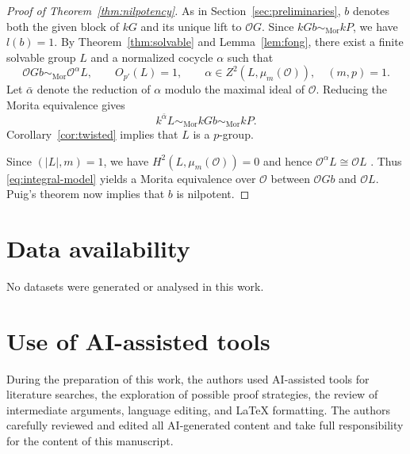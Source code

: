 \documentclass[11pt,a4paper]{article}
\theoremstyle{definition}
\theoremstyle{remark}
\numberwithin{equation}{section}
\newcommand{\cO}{\mathcal{O}}
\newcommand{\Mor}{\mathrm{Mor}}
\begin{document}
	\begin{proof}[Proof of Theorem~\ref{thm:nilpotency}]
		As in Section~\ref{sec:preliminaries}, $b$ denotes both the given block of $kG$ and its unique lift to $\cO G$.
		Since $kGb\sim_{\Mor}kP$, we have $l(b)=1$.
		By Theorem~\ref{thm:solvable} and Lemma~\ref{lem:fong}, there exist
		a finite solvable group $L$ and a normalized cocycle $\alpha$ such that
		\begin{equation}\label{eq:integral-model}
			\cO Gb\sim_{\Mor}\cO^\alpha L,
			\qquad O_{p'}(L)=1,
			\qquad \alpha\in Z^2(L,\mu_m(\cO)),\quad (m,p)=1.
		\end{equation}
		Let $\bar\alpha$ denote the reduction of $\alpha$ modulo the maximal ideal of $\cO$. Reducing the Morita equivalence gives
		\[
		k^{\bar\alpha}L\sim_{\Mor}kGb\sim_{\Mor}kP.
		\]
		Corollary~\ref{cor:twisted} implies that $L$ is a $p$-group.
		
		Since $(|L|,m)=1$, we have $H^2(L,\mu_m(\cO))=0$ and hence
		$\cO^\alpha L\cong\cO L$ \cite[Propositions~1.2.9(i) and~1.2.6]{Linckelmann2018a}.
		Thus \eqref{eq:integral-model} yields a Morita equivalence over $\cO$ between $\cO Gb$ and $\cO L$.
		Puig's theorem \cite[Theorem~8.2]{Puig1999} now implies that $b$ is nilpotent.
	\end{proof}
	
	\section*{Data availability}
	No datasets were generated or analysed in this work.
	
	\section*{Use of AI-assisted tools}
	During the preparation of this work, the authors used AI-assisted tools for literature searches, the exploration of possible proof strategies, the review of intermediate arguments, language editing, and LaTeX formatting. The authors carefully reviewed and edited all AI-generated content and take full responsibility for the content of this manuscript.
	
\end{document}
